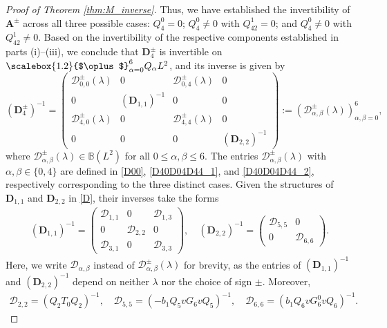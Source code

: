 \documentclass[reqno]{amsart}
\newcommand{\medoplus}
{\mathbin{\scalebox{1.2}{$\oplus$}}}
\numberwithin{equation}{section}
\begin{document}
\begin{proof}[Proof of Theorem \ref{thm:M_inverse}]
        
	Thus, we have established the invertibility of $\mathbf{A}^{\pm}$ across all three possible cases: $Q^0_4=0$; $Q^0_4\neq 0$ with $Q_{42}^1=0$; and $Q^0_4\neq 0$ with $Q_{42}^1\neq 0$. Based on the invertibility of the respective components established in parts (i)--(iii), we conclude that $\mathbf{D}_{4}^{\pm}$ is invertible on $\medoplus_{\alpha=0}^{6} Q_\alpha L^2$, and its inverse is given by    
\begin{equation}\label{inverse_D4}    
\left(\mathbf{D}_{4}^{\pm}\right)^{-1} =  
	\begin{pmatrix}    
		\mathcal{D}_{0,0}^{\pm}(\lambda) & 0 & \mathcal{D}_{0,4}^{\pm}(\lambda) & 0 \\    
		0 & \left(\mathbf{D}_{1,1}\right)^{-1} & 0 & 0 \\    
		\mathcal{D}_{4,0}^{\pm}(\lambda) & 0 & \mathcal{D}_{4,4}^{\pm}(\lambda) & 0 \\    
		0 & 0 & 0 & \left(\mathbf{D}_{2,2}\right)^{-1}
	\end{pmatrix}    
	:= \left( \mathcal{D}_{\alpha,\beta}^\pm(\lambda) \right)_{\alpha,\beta=0}^6,    
\end{equation}    
where $\mathcal{D}_{\alpha,\beta}^{\pm}(\lambda) \in \mathbb{B}(L^2)$ for all $0\leq\alpha,\beta\leq6$. The entries $\mathcal{D}_{\alpha,\beta}^{\pm}(\lambda)$ with $\alpha,\beta \in \{0,4\}$ are defined in \eqref{D00}, \eqref{D40D04D44_1}, and \eqref{D40D04D44_2}, respectively corresponding to the three distinct cases.    
Given the structures of $\mathbf{D}_{1,1}$ and $\mathbf{D}_{2,2}$ in \eqref{D}, their inverses take the forms  
		\begin{align}\label{D-invert}  
	\left(\mathbf{D}_{1,1}\right)^{-1}=  
			\begin{pmatrix}  
				\mathcal{D}_{1,1} & 0 & \mathcal{D}_{1,3} \\  
				0 & \mathcal{D}_{2,2} & 0 \\  
				\mathcal{D}_{3,1} & 0 & \mathcal{D}_{3,3}  
			\end{pmatrix}, \quad   
			\left(\mathbf{D}_{2,2} \right)^{-1}=   
			\begin{pmatrix}  
				\mathcal{D}_{5,5} & 0 \\  
				0 & \mathcal{D}_{6,6}  
			\end{pmatrix}.  
		\end{align}  
		Here, we write $\mathcal{D}_{\alpha,\beta}$ instead of $\mathcal{D}_{\alpha,\beta}^\pm(\lambda)$ for brevity, as the entries of $\left(\mathbf{D}_{1,1}\right)^{-1}$ and $\left(\mathbf{D}_{2,2}\right)^{-1}$ depend on neither $\lambda$ nor the choice of sign $\pm$. Moreover, 
		\begin{align*}  
			\mathcal{D}_{2,2} = (Q_2 T_0 Q_2)^{-1}, \quad  
			\mathcal{D}_{5,5} = (-b_1 Q_5 v G_6 v Q_5)^{-1}, \quad  
			\mathcal{D}_{6,6} = (b_1 Q_6 v G_6^0 v Q_6)^{-1}.  
		\end{align*}  
		

\end{proof}
\end{document}
